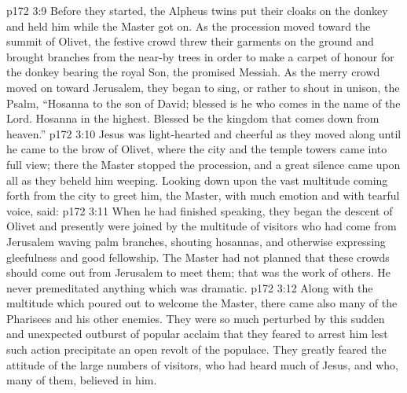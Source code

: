\vs p172 3:9 Before they started, the Alpheus twins put their cloaks on the donkey and held him while the Master got on. As the procession moved toward the summit of Olivet, the festive crowd threw their garments on the ground and brought branches from the near-by trees in order to make a carpet of honour for the donkey bearing the royal Son, the promised Messiah. As the merry crowd moved on toward Jerusalem, they began to sing, or rather to shout in unison, the Psalm, “Hosanna to the son of David; blessed is he who comes in the name of the Lord. Hosanna in the highest. Blessed be the kingdom that comes down from heaven.”
\vs p172 3:10 Jesus was light\hyp{}hearted and cheerful as they moved along until he came to the brow of Olivet, where the city and the temple towers came into full view; there the Master stopped the procession, and a great silence came upon all as they beheld him weeping. Looking down upon the vast multitude coming forth from the city to greet him, the Master, with much emotion and with tearful voice, said: 
\vs p172 3:11 When he had finished speaking, they began the descent of Olivet and presently were joined by the multitude of visitors who had come from Jerusalem waving palm branches, shouting hosannas, and otherwise expressing gleefulness and good fellowship. The Master had not planned that these crowds should come out from Jerusalem to meet them; that was the work of others. He never premeditated anything which was dramatic.
\vs p172 3:12 Along with the multitude which poured out to welcome the Master, there came also many of the Pharisees and his other enemies. They were so much perturbed by this sudden and unexpected outburst of popular acclaim that they feared to arrest him lest such action precipitate an open revolt of the populace. They greatly feared the attitude of the large numbers of visitors, who had heard much of Jesus, and who, many of them, believed in him.
